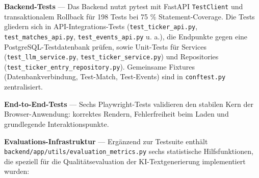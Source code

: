 \begin{Shaded}
\begin{Highlighting}[]
\NormalTok{(}\OperatorTok{,}\NormalTok{ () }\KeywordTok{=\textgreater{}}\NormalTok{ \{}
  \OperatorTok{=} \NormalTok{(}\OperatorTok{,} \NormalTok{)}\OperatorTok{;}
  \NormalTok{)}\NormalTok{(}\NormalTok{)}\OperatorTok{;}
  \NormalTok{)}\NormalTok{(}\NormalTok{)}\OperatorTok{;}
  \NormalTok{)}\NormalTok{(}\NormalTok{)}\OperatorTok{;}
  \NormalTok{)}\NormalTok{(}\NormalTok{)}\OperatorTok{;}
  \NormalTok{)}\NormalTok{(}\NormalTok{)}\OperatorTok{;}
\NormalTok{\})}\OperatorTok{;}
\end{Highlighting}
\end{Shaded}

\textbf{Backend-Tests} --- Das Backend nutzt pytest mit FastAPI
\texttt{TestClient} und transaktionalem Rollback für 198 Tests bei 75 \%
Statement-Coverage. Die Tests gliedern sich in API-Integrations-Tests
(\texttt{test\_ticker\_api.py}, \texttt{test\_matches\_api.py},
\texttt{test\_events\_api.py} u. a.), die Endpunkte gegen eine
PostgreSQL-Testdatenbank prüfen, sowie Unit-Tests für Services
(\texttt{test\_llm\_service.py}, \texttt{test\_ticker\_service.py}) und
Repositories (\texttt{test\_ticker\_entry\_repository.py}). Gemeinsame
Fixtures (Datenbankverbindung, Test-Match, Test-Events) sind in
\texttt{conftest.py} zentralisiert.

\textbf{End-to-End-Tests} --- Sechs Playwright-Tests validieren den
stabilen Kern der Browser-Anwendung: korrektes Rendern, Fehlerfreiheit
beim Laden und grundlegende Interaktionspunkte.

\textbf{Evaluations-Infrastruktur} --- Ergänzend zur Testsuite enthält
\texttt{backend/app/utils/evaluation\_metrics.py} sechs statistische
Hilfsfunktionen, die speziell für die Qualitätsevaluation der
KI-Textgenerierung implementiert wurden:

